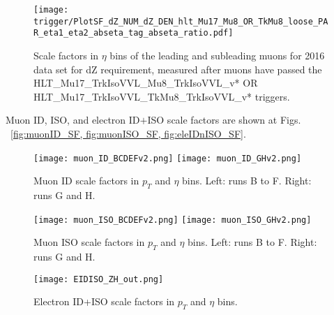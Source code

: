 \begin{figure}
\centering
\texttt{[image: trigger/PlotSF\_dZ\_NUM\_dZ\_DEN\_hlt\_Mu17\_Mu8\_OR\_TkMu8\_loose\_PAR\_eta1\_eta2\_abseta\_tag\_abseta\_ratio.pdf]}
\caption{Scale factors in $\eta$ bins of the leading and subleading muons for 2016 data set for dZ requirement, measured after muons have passed the HLT\_Mu17\_TrkIsoVVL\_Mu8\_TrkIsoVVL\_v* OR HLT\_Mu17\_TrkIsoVVL\_TkMu8\_TrkIsoVVL\_v* triggers. }
\label{fig:trigger_SF_dimu_dZ_H}
\end{figure}


Muon ID, ISO, and electron ID$+$ISO scale factors are shown at Figs. ~\ref{fig:muonID_SF, fig:muonISO_SF, fig:eleIDnISO_SF}.
\begin{figure}
\centering
\texttt{[image: muon\_ID\_BCDEFv2.png]}
\bigbreak
\texttt{[image: muon\_ID\_GHv2.png]}
\caption{ Muon ID scale factors in $p_{T}$ and $\eta$ bins. Left: runs B to F. Right: runs G and H.}
\label{fig:muonID_SF}
\end{figure}

\newline
\newline

\begin{figure}
\centering
\texttt{[image: muon\_ISO\_BCDEFv2.png]}
\bigbreak
\texttt{[image: muon\_ISO\_GHv2.png]}
\caption{ Muon ISO scale factors in $p_{T}$ and $\eta$ bins. Left: runs B to F. Right: runs G and H.}
\label{fig:muonISO_SF}
\end{figure}

\newline
\newline

\begin{figure}
\centering
\texttt{[image: EIDISO\_ZH\_out.png]}
\caption{ Electron ID+ISO scale factors in $p_{T}$ and $\eta$ bins.}
\label{fig:eleIDnISO_SF}
\end{figure}

